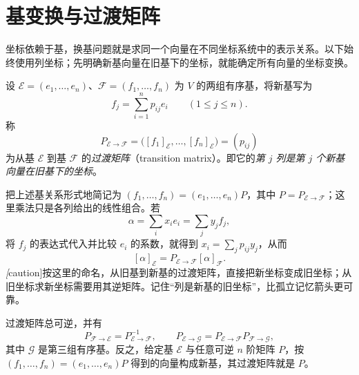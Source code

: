 \section{基变换与过渡矩阵}
\label{sec:basis-change-transition}

坐标依赖于基，换基问题就是求同一个向量在不同坐标系统中的表示关系。以下始终使用列坐标；先明确新基向量在旧基下的坐标，就能确定所有向量的坐标变换。

\begin{definition}
\label{def:transition-matrix}
设 $\mathcal E=(e_1,\ldots,e_n)$、$\mathcal F=(f_1,\ldots,f_n)$ 为 $V$ 的两组有序基，将新基写为
\[
    f_j=\sum_{i=1}^n p_{ij}e_i\qquad(1\leq j\leq n).
\]
称
\begin{equation}
\label{eq:transition-matrix-columns}
    P_{\mathcal E\to\mathcal F}
    =\bigl([f_1]_{\mathcal E},\ldots,[f_n]_{\mathcal E}\bigr)
    =(p_{ij})
\end{equation}
为从基 $\mathcal E$ 到基 $\mathcal F$ 的\emph{过渡矩阵}（transition matrix）。即它的\emph{第 $j$ 列是第 $j$ 个新基向量在旧基下的坐标}。
\end{definition}

把上述基关系形式地简记为 $(f_1,\ldots,f_n)=(e_1,\ldots,e_n)P$，其中 $P=P_{\mathcal E\to\mathcal F}$；这里乘法只是各列给出的线性组合。若
\[
    \alpha=\sum_i x_ie_i=\sum_j y_jf_j,
\]
将 $f_j$ 的表达式代入并比较 $e_i$ 的系数，就得到 $x_i=\sum_jp_{ij}y_j$，从而
\begin{equation}
\label{eq:coordinate-change-column}
    [\alpha]_{\mathcal E}=P_{\mathcal E\to\mathcal F}[\alpha]_{\mathcal F}.
\end{equation}
\emph[caution]{按这里的命名，从旧基到新基的过渡矩阵，直接把新坐标变成旧坐标；从旧坐标求新坐标需要用其逆矩阵}。记住“列是新基的旧坐标”，比孤立记忆箭头更可靠。

\begin{theorem}
\label{thm:transition-inverse-composition}
过渡矩阵总可逆，并有
\begin{equation}
\label{eq:transition-inverse-composition}
    P_{\mathcal F\to\mathcal E}=P_{\mathcal E\to\mathcal F}^{-1},\qquad
    P_{\mathcal E\to\mathcal G}
    =P_{\mathcal E\to\mathcal F}P_{\mathcal F\to\mathcal G},
\end{equation}
其中 $\mathcal G$ 是第三组有序基。反之，给定基 $\mathcal E$ 与任意可逆 $n$ 阶矩阵 $P$，按 $(f_1,\ldots,f_n)=(e_1,\ldots,e_n)P$ 得到的向量构成新基，其过渡矩阵就是 $P$。
\end{theorem}

